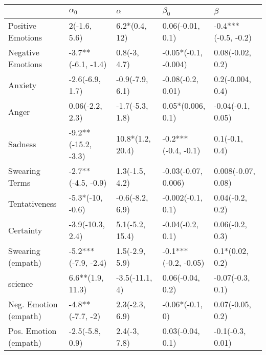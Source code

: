 \begin{tabular}{lllll}
\toprule
{} &           $\alpha_0$ &          $\alpha$ &             $\beta_0$ &              $\beta$ \\
\midrule
Positive Emotions     &         2(-1.6, 5.6) &     6.2*(0.4, 12) &      0.06(-0.01, 0.1) &  -0.4***(-0.5, -0.2) \\
Negative Emotions     &   -3.7**(-6.1, -1.4) &      0.8(-3, 4.7) &  -0.05*(-0.1, -0.004) &     0.08(-0.02, 0.2) \\
Anxiety               &      -2.6(-6.9, 1.7) &   -0.9(-7.9, 6.1) &     -0.08(-0.2, 0.01) &     0.2(-0.004, 0.4) \\
Anger                 &      0.06(-2.2, 2.3) &   -1.7(-5.3, 1.8) &     0.05*(0.006, 0.1) &    -0.04(-0.1, 0.05) \\
Sadness               &  -9.2**(-15.2, -3.3) &  10.8*(1.2, 20.4) &   -0.2***(-0.4, -0.1) &       0.1(-0.1, 0.4) \\
Swearing Terms        &   -2.7**(-4.5, -0.9) &    1.3(-1.5, 4.2) &   -0.03(-0.07, 0.006) &   0.008(-0.07, 0.08) \\
Tentativeness         &     -5.3*(-10, -0.6) &   -0.6(-8.2, 6.9) &     -0.002(-0.1, 0.1) &      0.04(-0.2, 0.2) \\
Certainty             &     -3.9(-10.3, 2.4) &   5.1(-5.2, 15.4) &      -0.04(-0.2, 0.1) &      0.06(-0.2, 0.3) \\
Swearing (empath)     &  -5.2***(-7.9, -2.4) &    1.5(-2.9, 5.9) &  -0.1***(-0.2, -0.05) &      0.1*(0.02, 0.2) \\
science               &     6.6**(1.9, 11.3) &    -3.5(-11.1, 4) &      0.06(-0.04, 0.2) &     -0.07(-0.3, 0.1) \\
Neg. Emotion (empath) &     -4.8**(-7.7, -2) &    2.3(-2.3, 6.9) &       -0.06*(-0.1, 0) &     0.07(-0.05, 0.2) \\
Pos. Emotion (empath) &      -2.5(-5.8, 0.9) &      2.4(-3, 7.8) &      0.03(-0.04, 0.1) &     -0.1(-0.3, 0.01) \\
\bottomrule
\end{tabular}
